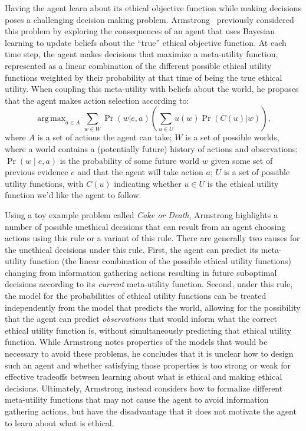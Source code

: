 \documentclass[11pt]{article}
\DeclareMathOperator*{\argmax}{arg\,max}
\begin{document}
Having the agent learn about its ethical objective function while making decisions poses a challenging decision making problem. Armstrong~ previously considered this problem by exploring the consequences of an agent that uses Bayesian learning to update beliefs about the ``true'' ethical objective function. At each time step, the agent makes decisions that maximize a meta-utility function, represented as a linear combination of the different possible ethical utility functions weighted by their probability at that time of being the true ethical utility. When coupling this meta-utility with beliefs about the world, he proposes that the agent makes action selection according to:
\begin{equation}
\label{eq:armstrong}
\argmax_{a \in A} \sum_{w \in W} \Pr(w | e, a) \left( \sum_{u \in U} u(w) \Pr(C(u)|w) \right),
\end{equation}
where $A$ is a set of actions the agent can take; $W$ is a set of possible worlds, where a world contains a (potentially future) history of actions and observations; $\Pr(w \mid e, a)$ is the probability of some future world $w$ given some set of previous evidence $e$ and that the agent will take action $a$; $U$ is a set of possible utility functions, with $C(u)$ indicating whether $u \in U$ is the ethical utility function we'd like the agent to follow.

Using a toy example problem called {\em Cake or Death}, Armstrong highlights a number of possible unethical decisions that can result from an agent choosing actions using this rule or a variant of this rule. There are generally two causes for the unethical decisions under this rule. First, the agent can predict its meta-utility function (the linear combination of the possible ethical utility functions) changing from information gathering actions resulting in future suboptimal decisions according to its {\em current} meta-utility function. Second, under this rule, the model for the probabilities of ethical utility functions can be treated independently from the model that predicts the world, allowing for the possibility that the agent can predict {\em observations} that would inform what the correct ethical utility function is, without simultaneously predicting that ethical utility function. While Armstrong notes properties of the models that would be necessary to avoid these problems, he concludes that it is unclear how to design such an agent and whether satisfying those properties is too strong or weak for effective tradeoffs between learning about what is ethical and making ethical decisions. Ultimately, Armstrong instead considers how to formalize different meta-utility functions that may not cause the agent to avoid information gathering actions, but have the disadvantage that it does not motivate the agent to learn about what is ethical.
\end{document}
